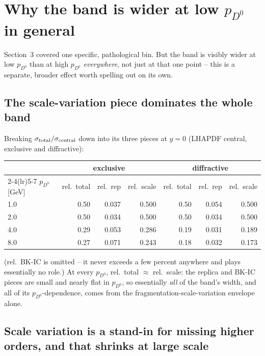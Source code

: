 \documentclass[11pt]{article}
\begin{document}
\section{Why the band is wider at low $p_{D^0}$ in general}

Section~3 covered one specific, pathological bin. But the band is visibly
wider at low $p_{D^0}$ than at high $p_{D^0}$ \emph{everywhere}, not just at
that one point -- this is a separate, broader effect worth spelling out on
its own.

\subsection{The scale-variation piece dominates the whole band}

Breaking $\sigma_{\rm total}/\sigma_{\rm central}$ down into its three
pieces at $y=0$ (LHAPDF central, exclusive and diffractive):

\begin{center}
\begin{tabular}{lrrrrrr}
\toprule
& \multicolumn{3}{c}{exclusive} & \multicolumn{3}{c}{diffractive} \\
\cmidrule(lr){2-4}\cmidrule(lr){5-7}
$p_{D^0}$ [GeV] & rel.\ total & rel.\ rep & rel.\ scale
                & rel.\ total & rel.\ rep & rel.\ scale \\
\midrule
1.0 & 0.50 & 0.037 & 0.500 & 0.50 & 0.054 & 0.500 \\
2.0 & 0.50 & 0.034 & 0.500 & 0.50 & 0.034 & 0.500 \\
4.0 & 0.29 & 0.053 & 0.286 & 0.19 & 0.031 & 0.189 \\
8.0 & 0.27 & 0.071 & 0.243 & 0.18 & 0.032 & 0.173 \\
\bottomrule
\end{tabular}
\end{center}

(rel.\ BK-IC is omitted -- it never exceeds a few percent anywhere and
plays essentially no role.) At every $p_{D^0}$, rel.\ total $\approx$
rel.\ scale: the replica and BK-IC pieces are small and nearly flat in
$p_{D^0}$, so essentially \emph{all} of the band's width, and all of its
$p_{D^0}$-dependence, comes from the fragmentation-scale-variation
envelope alone.

\subsection{Scale variation is a stand-in for missing higher orders, and
that shrinks at large scale}
\end{document}
